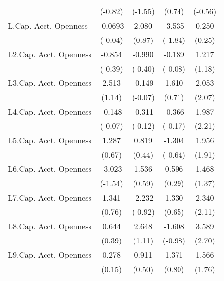 {\begin{longtable}{l*{4}{c}}
                &  (-0.82)         &  (-1.55)         &   (0.74)         &  (-0.56)         \\
[1em]
L.Cap. Acct. Openness&  -0.0693         &    2.080         &   -3.535         &    0.250         \\
                &  (-0.04)         &   (0.87)         &  (-1.84)         &   (0.25)         \\
[1em]
L2.Cap. Acct. Openness&   -0.854         &   -0.990         &   -0.189         &    1.217         \\
                &  (-0.39)         &  (-0.40)         &  (-0.08)         &   (1.18)         \\
[1em]
L3.Cap. Acct. Openness&    2.513         &   -0.149         &    1.610         &    2.053\sym{*}  \\
                &   (1.14)         &  (-0.07)         &   (0.71)         &   (2.07)         \\
[1em]
L4.Cap. Acct. Openness&   -0.148         &   -0.311         &   -0.366         &    1.987\sym{*}  \\
                &  (-0.07)         &  (-0.12)         &  (-0.17)         &   (2.21)         \\
[1em]
L5.Cap. Acct. Openness&    1.287         &    0.819         &   -1.304         &    1.956         \\
                &   (0.67)         &   (0.44)         &  (-0.64)         &   (1.91)         \\
[1em]
L6.Cap. Acct. Openness&   -3.023         &    1.536         &    0.596         &    1.468         \\
                &  (-1.54)         &   (0.59)         &   (0.29)         &   (1.37)         \\
[1em]
L7.Cap. Acct. Openness&    1.341         &   -2.232         &    1.330         &    2.340\sym{*}  \\
                &   (0.76)         &  (-0.92)         &   (0.65)         &   (2.11)         \\
[1em]
L8.Cap. Acct. Openness&    0.644         &    2.648         &   -1.608         &    3.589\sym{**} \\
                &   (0.39)         &   (1.11)         &  (-0.98)         &   (2.70)         \\
[1em]
L9.Cap. Acct. Openness&    0.278         &    0.911         &    1.371         &    1.566         \\
                &   (0.15)         &   (0.50)         &   (0.80)         &   (1.76)         \\

\end{longtable}}
